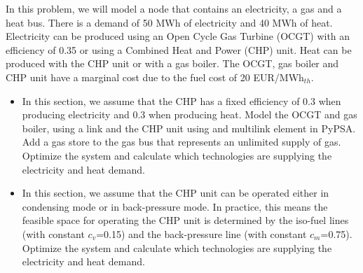 \documentclass[10pt]{article}
\newenvironment{problem}[2][Problem]{\begin{trivlist}
\item[\hskip \labelsep {\bfseries #1}\hskip \labelsep {\bfseries #2.}]}{\end{trivlist}}
\begin{document}
\begin{problem}{7.4}
In this problem, we will model a node that contains an electricity, a gas and a heat bus. There is a demand of 50 MWh of electricity and 40 MWh of heat. Electricity can be produced using an Open Cycle Gas Turbine (OCGT) with an efficiency of 0.35 or using a Combined Heat and Power (CHP) unit. Heat can be produced with the CHP unit or with a gas boiler. The OCGT, gas boiler and CHP unit have a marginal cost due to the fuel cost of 20 EUR/MWh$_{th}$.

\begin{itemize}
\item[a)] In this section, we assume that the CHP has a fixed efficiency of 0.3 when producing electricity and 0.3 when producing heat. Model the OCGT and gas boiler, using a link and the CHP unit using and multilink element in PyPSA. Add a gas store to the gas bus that represents an unlimited supply of gas. Optimize the system and calculate which technologies are supplying the electricity and heat demand.

\item[b)]  In this section, we assume that the CHP unit can be operated either in condensing mode or in back-pressure mode. In practice, this means the feasible space for operating the CHP unit is determined by the iso-fuel lines (with constant $c_v$=0.15) and the back-pressure line (with constant $c_m$=0.75). Optimize the system and calculate which technologies are supplying the electricity and heat demand.
\end{itemize}

\end{problem}
\end{document}
